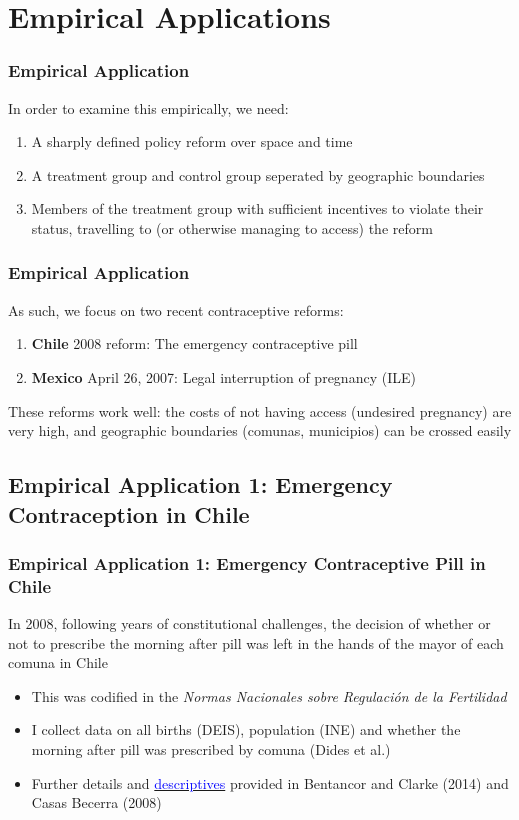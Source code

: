 \documentclass[10pt,letterpaper,subeqn]{beamer}
\begin{document}
\section{Empirical Applications}
\begin{frame}[label=empir1]
  \frametitle{Empirical Application}
In order to examine this empirically, we need:
\vspace{4mm}
\begin{enumerate}
\item A sharply defined policy reform over space and time
\item A treatment group and control group seperated by geographic boundaries
\item Members of the treatment group with sufficient incentives to violate their
status, travelling to (or otherwise managing to access) the reform
\end{enumerate}
\end{frame}

\begin{frame}[label=empir2]
  \frametitle{Empirical Application}
As such, we focus on two recent contraceptive reforms:
\vspace{6mm}
\begin{enumerate}
\item \textbf{Chile} 2008 reform: The emergency contraceptive pill
\item \textbf{Mexico} April 26, 2007: Legal interruption of pregnancy (ILE)
\end{enumerate}
\vspace{6mm}
These reforms work well: the costs of not having access (undesired pregnancy) are
very high, and geographic boundaries (comunas, municipios) can be crossed easily
\end{frame}


\subsection{Empirical Application 1: Emergency Contraception in Chile}
\begin{frame}[label=empirA]
  \frametitle{Empirical Application 1: Emergency Contraceptive Pill in Chile} 
In 2008, following years of constitutional challenges, the decision of whether
or not to prescribe the morning after pill was left in the hands of the mayor of
each comuna in Chile
\vspace{5mm}
\begin{itemize}
\item This was codified in the \emph{Normas Nacionales sobre Regulaci\'on de la 
Fertilidad}
\item I collect data on all births (DEIS), population (INE) and whether the 
morning after pill was prescribed by comuna (Dides et al.)
\item Further details and \hyperlink{ChileDesc}{\textcolor{blue}{descriptives}} provided 
in Bentancor and Clarke (2014) and Casas Becerra (2008)
\end{itemize}
\end{frame}
\end{document}
